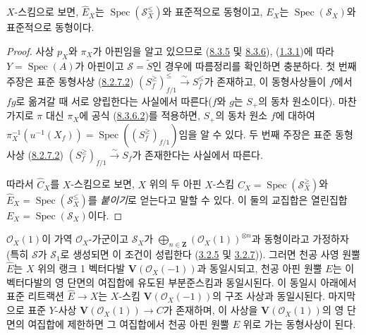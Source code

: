 \begin{corollary}[8.6.3]
\label{II.8.6.3-ko}
$X$-스킴으로 보면, $\widehat{E}_X$는
$\operatorname{Spec}(\mathcal{S}_X^{\leq})$와 표준적으로 동형이고,
$E_X$는 $\operatorname{Spec}(\mathcal{S}_X)$와 표준적으로 동형이다.
\end{corollary}

\begin{proof}
사상 $p_X$와 $\pi_X$가 아핀임을 알고 있으므로
(\hyperref[II.8.3.5-ko]{8.3.5} 및
\hyperref[II.8.3.6-ko]{8.3.6}),
(\hyperref[II.1.3.1-ko]{1.3.1})에 따라
$Y=\operatorname{Spec}(A)$가 아핀이고 $\mathcal{S}=\widetilde{S}$인
경우에 따름정리를 확인하면 충분하다. 첫 번째 주장은 표준 동형사상
(\hyperref[II.8.2.7.2-ko]{8.2.7.2})
$(S_f^{\geq})_{f/1}^{\leq}\xrightarrow{\sim}S_f^{\leq}$가 존재하고,
이 동형사상들이 $f$에서 $fg$로 옮겨갈 때 서로 양립한다는 사실에서
따른다($f$와 $g$는 $S_+$의 동차 원소이다). 마찬가지로 $\pi$ 대신
$\pi_X$에 공식 (\hyperref[II.8.3.6.2-ko]{8.3.6.2})를 적용하면,
$S_+$의 동차 원소 $f$에 대하여
$\pi_X^{-1}(u^{-1}(X_f))=
\operatorname{Spec}((S_f^{\geq})_{f/1})$임을 알 수 있다. 두 번째 주장은
표준 동형사상 (\hyperref[II.8.2.7.2-ko]{8.2.7.2})
$(S_f^{\geq})_{f/1}\xrightarrow{\sim}S_f$가 존재한다는 사실에서 따른다.

따라서 $\widehat{C}_X$를 $X$-스킴으로 보면, $X$ 위의 두 아핀
$X$-스킴
$C_X=\operatorname{Spec}(\mathcal{S}_X^{\geq})$와
$\widehat{E}_X=\operatorname{Spec}(\mathcal{S}_X^{\leq})$를
\emph{붙이기}로 얻는다고 말할 수 있다. 이 둘의 교집합은 열린집합
$E_X=\operatorname{Spec}(\mathcal{S}_X)$이다.
\end{proof}

\begin{corollary}[8.6.4]
\label{II.8.6.4-ko}
$\mathcal{O}_X(1)$이 가역 $\mathcal{O}_X$-가군이고
$\mathcal{S}_X$가
$\bigoplus_{n\in\mathbf{Z}}(\mathcal{O}_X(1))^{\otimes n}$과
동형이라고 가정하자(특히 $\mathcal{S}$가 $\mathcal{S}_1$로 생성되면
이 조건이 성립한다
(\hyperref[II.3.2.5-ko]{3.2.5} 및
\hyperref[II.3.2.7-ko]{3.2.7})). 그러면 천공 사영 원뿔
$\widehat{E}$는 $X$ 위의 랭크 1 벡터다발
$\mathbf{V}(\mathcal{O}_X(-1))$과 동일시되고, 천공 아핀 원뿔 $E$는
이 벡터다발의 영 단면의 여집합에 유도된 부분준스킴과 동일시된다.
이 동일시 아래에서 표준 리트랙션 $\widehat{E}\to X$는
$X$-스킴 $\mathbf{V}(\mathcal{O}_X(-1))$의 구조 사상과 동일시된다.
마지막으로 표준 $Y$-사상
$\mathbf{V}(\mathcal{O}_X(1))\to C$가 존재하며, 이 사상을
$\mathbf{V}(\mathcal{O}_X(1))$의 영 단면의 여집합에 제한하면 그
여집합에서 천공 아핀 원뿔 $E$ 위로 가는 동형사상이 된다.
\end{corollary}

